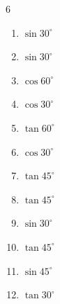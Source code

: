 \begin{multicols}{6}
\begin{enumerate}

  \item $\displaystyle \sin{30^\circ}$


  \item $\displaystyle \sin{30^\circ}$


  \item $\displaystyle \cos{60^\circ}$


  \item $\displaystyle \cos{30^\circ}$


  \item $\displaystyle \tan{60^\circ}$


  \item $\displaystyle \cos{30^\circ}$


  \item $\displaystyle \tan{45^\circ}$

        \phantom{$\displaystyle =1$}

  \item $\displaystyle \tan{45^\circ}$

        \phantom{$\displaystyle =1$}

  \item $\displaystyle \sin{30^\circ}$


\columnbreak %

  \item $\displaystyle \tan{45^\circ}$

        \phantom{$\displaystyle =1$}

  \item $\displaystyle \sin{45^\circ}$


  \item $\displaystyle \tan{30^\circ}$



\end{enumerate}
\end{multicols}
